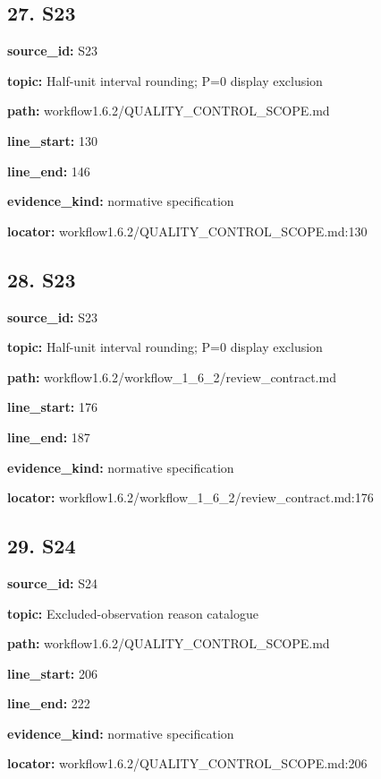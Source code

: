 \documentclass[10pt,a4paper]{article}
\begin{document}
\subsection*{27.\allowbreak{} S23}
\textbf{source\_\allowbreak{}id:} S23\par
\textbf{topic:} Half-\allowbreak{}unit interval rounding; P=0 display exclusion\par
\textbf{path:} workflow1.\allowbreak{}6.\allowbreak{}2/\allowbreak{}QUALITY\_\allowbreak{}CONTROL\_\allowbreak{}SCOPE.\allowbreak{}md\par
\textbf{line\_\allowbreak{}start:} 130\par
\textbf{line\_\allowbreak{}end:} 146\par
\textbf{evidence\_\allowbreak{}kind:} normative specification\par
\textbf{locator:} workflow1.\allowbreak{}6.\allowbreak{}2/\allowbreak{}QUALITY\_\allowbreak{}CONTROL\_\allowbreak{}SCOPE.\allowbreak{}md:130\par
\subsection*{28.\allowbreak{} S23}
\textbf{source\_\allowbreak{}id:} S23\par
\textbf{topic:} Half-\allowbreak{}unit interval rounding; P=0 display exclusion\par
\textbf{path:} workflow1.\allowbreak{}6.\allowbreak{}2/\allowbreak{}workflow\_\allowbreak{}1\_\allowbreak{}6\_\allowbreak{}2/\allowbreak{}review\_\allowbreak{}contract.\allowbreak{}md\par
\textbf{line\_\allowbreak{}start:} 176\par
\textbf{line\_\allowbreak{}end:} 187\par
\textbf{evidence\_\allowbreak{}kind:} normative specification\par
\textbf{locator:} workflow1.\allowbreak{}6.\allowbreak{}2/\allowbreak{}workflow\_\allowbreak{}1\_\allowbreak{}6\_\allowbreak{}2/\allowbreak{}review\_\allowbreak{}contract.\allowbreak{}md:176\par
\subsection*{29.\allowbreak{} S24}
\textbf{source\_\allowbreak{}id:} S24\par
\textbf{topic:} Excluded-\allowbreak{}observation reason catalogue\par
\textbf{path:} workflow1.\allowbreak{}6.\allowbreak{}2/\allowbreak{}QUALITY\_\allowbreak{}CONTROL\_\allowbreak{}SCOPE.\allowbreak{}md\par
\textbf{line\_\allowbreak{}start:} 206\par
\textbf{line\_\allowbreak{}end:} 222\par
\textbf{evidence\_\allowbreak{}kind:} normative specification\par
\textbf{locator:} workflow1.\allowbreak{}6.\allowbreak{}2/\allowbreak{}QUALITY\_\allowbreak{}CONTROL\_\allowbreak{}SCOPE.\allowbreak{}md:206\par
\end{document}

